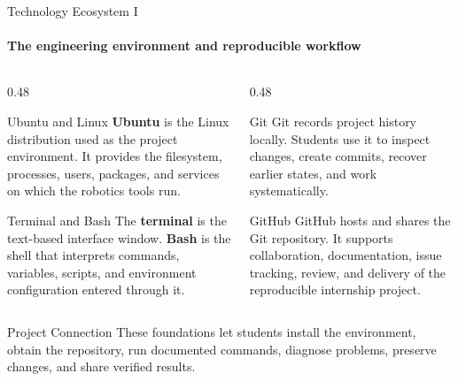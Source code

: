 \begin{frame}{Technology Ecosystem I}
\framesubtitle{The engineering environment and reproducible workflow}
\footnotesize
\begin{columns}[T,onlytextwidth]
    \begin{column}{0.48\textwidth}
        \begin{block}{Ubuntu and Linux}
            \textbf{Ubuntu} is the Linux distribution used as the project environment. It provides the filesystem, processes, users, packages, and services on which the robotics tools run.
        \end{block}
        \begin{block}{Terminal and Bash}
            The \textbf{terminal} is the text-based interface window. \textbf{Bash} is the shell that interprets commands, variables, scripts, and environment configuration entered through it.
        \end{block}
    \end{column}
    \begin{column}{0.48\textwidth}
        \begin{block}{Git}
            Git records project history locally. Students use it to inspect changes, create commits, recover earlier states, and work systematically.
        \end{block}
        \begin{block}{GitHub}
            GitHub hosts and shares the Git repository. It supports collaboration, documentation, issue tracking, review, and delivery of the reproducible internship project.
        \end{block}
    \end{column}
\end{columns}
\begin{exampleblock}{Project Connection}
These foundations let students install the environment, obtain the repository, run documented commands, diagnose problems, preserve changes, and share verified results.
\end{exampleblock}
\end{frame}

